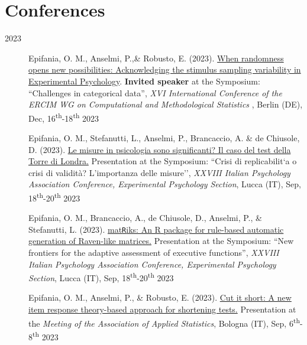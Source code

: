 \documentclass[letterpaper,12pt]{article}
\begin{document}
\section{Conferences}
\begin{description}
	
	\item[2023] 
	
		\item[] Epifania, O. M., Anselmi, P.,\& Robusto, E. (2023). \href{https://ottaviae.github.io/presentations/Berlino2023/CMS-epifania.pdf}{When randomness opens new possibilities: Acknowledging the stimulus sampling variability in Experimental Psychology}. \textbf{Invited speaker} at the Symposium: ``Challenges in categorical data'',   \emph{XVI International Conference of the ERCIM WG on Computational and Methodological Statistics }, Berlin (DE), Dec, 16\textsuperscript{th}-18\textsuperscript{th} 2023
	
			\item[] Epifania, O. M., Stefanutti, L.,  Anselmi, P., Brancaccio, A. \& de Chiusole, D. (2023). \href{https://ottaviae.github.io/presentations/AIP2023/Simposio-validita/epifania-meaningfullness.pdf}{Le misure in psicologia sono significanti?
				Il caso del test della Torre di Londra.} Presentation at the Symposium: ``Crisi di replicabilit`a o crisi di validità? L’importanza delle misure'',   \emph{XXVIII Italian Psychology Association Conference, Experimental Psychology Section}, Lucca (IT), Sep, 18\textsuperscript{th}-20\textsuperscript{th} 2023
	
		\item[] Epifania, O. M., Brancaccio, A., de Chiusole, D., Anselmi, P., \& Stefanutti, L. (2023). \href{https://ottaviae.github.io/presentations/AIP2023/Simposio-PRIN/AIP-2023-epifania-matRiks.pdf}{mat\texttt{R}iks: An R package for rule-based automatic generation of Raven-like matrices.} Presentation at the Symposium: ``New frontiers for the adaptive assessment of executive functions'',   \emph{XXVIII Italian Psychology Association Conference, Experimental Psychology Section}, Lucca (IT), Sep, 18\textsuperscript{th}-20\textsuperscript{th} 2023
	
		\item[] Epifania, O. M., Anselmi, P., \& Robusto, E. (2023). \href{https://ottaviae.github.io/presentations/Bologna2023/Cut-it-short.pdf}{Cut it short: A new item response theory-based approach for shortening tests.} Presentation at the \emph{Meeting of the Association of Applied Statistics},  Bologna (IT), Sep, 6\textsuperscript{th}-8\textsuperscript{th} 2023
	

\end{description}
\end{document}
